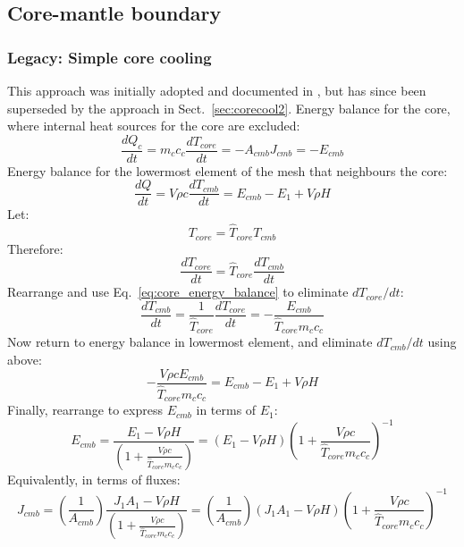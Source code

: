 \subsection{Core-mantle boundary}
\subsubsection{Legacy: Simple core cooling}
This approach was initially adopted and documented in \cite{BSW18}, but has since been superseded by the approach in Sect.~\ref{sec:corecool2}.  Energy balance for the core, where internal heat sources for the core are excluded:
\begin{equation}
\frac{dQ_c}{dt} = m_c c_c \frac{dT_{core}}{dt} = -A_{cmb} J_{cmb} = -E_{cmb}
\label{eq:core_energy_balance}
\end{equation}
Energy balance for the lowermost element of the mesh that neighbours the core:
\begin{equation}
\frac{dQ}{dt}= V \rho c \frac{dT_{cmb}}{dt} = E_{cmb} - E_1 + V \rho H 
\end{equation}
Let:
\begin{equation}
T_{core} = \hat{T}_{core} T_{cmb}
\end{equation}
Therefore:
\begin{equation}
\frac{dT_{core}}{dt} = \hat{T}_{core} \frac{dT_{cmb}}{dt}
\end{equation}
Rearrange and use Eq.~\ref{eq:core_energy_balance} to eliminate $dT_{core}/dt$:
\begin{equation}
\frac{dT_{cmb}}{dt} = \frac{1}{\hat{T}_{core}} \frac{dT_{core}}{dt} = -\frac{E_{cmb}}{\hat{T}_{core} m_c c_c}
\end{equation}
Now return to energy balance in lowermost element, and eliminate $dT_{cmb}/dt$ using above:
\begin{equation}
- \frac{V \rho c E_{cmb}}{\hat{T}_{core} m_c c_c} = E_{cmb} - E_1 + V \rho H 
\end{equation}
Finally, rearrange to express $E_{cmb}$ in terms of $E_1$:
\begin{equation}
E_{cmb} = \frac{E_1 - V \rho H}{\left(1+\frac{V \rho c}{\hat{T}_{core} m_c c_c}\right)} = (E_1 - V \rho H)\left(1+\frac{V \rho c}{\hat{T}_{core} m_c c_c}\right)^{-1}
\end{equation}
Equivalently, in terms of fluxes:
\begin{equation}
J_{cmb} = \left( \frac{1}{A_{cmb}} \right) \frac{J_1A_1 - V \rho H}{\left(1+\frac{V \rho c}{\hat{T}_{core} m_c c_c}\right)} = \left( \frac{1}{A_{cmb}} \right) (J_1A_1 - V \rho H)\left(1+\frac{V \rho c}{\hat{T}_{core} m_c c_c}\right)^{-1}
\end{equation}
